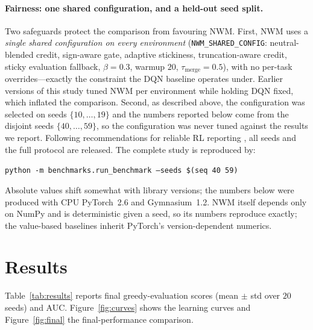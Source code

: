 \documentclass[11pt]{article}
\newcommand{\NWM}{\textsc{NWM}}
\begin{document}
\paragraph{Fairness: one shared configuration, and a held-out seed split.}
Two safeguards protect the comparison from favouring \NWM{}. First,
\NWM{} uses a \emph{single shared configuration on every environment}
(\texttt{NWM\_SHARED\_CONFIG}: neutral-blended credit, sign-aware gate,
adaptive stickiness, truncation-aware credit, sticky evaluation fallback,
$\beta{=}0.3$, warmup $20$, $\tau_{\mathrm{merge}}{=}0.5$), with no
per-task overrides---exactly the constraint the DQN baseline operates under.
Earlier versions of this study tuned \NWM{} per environment while holding DQN
fixed, which inflated the comparison. Second, as described above, the
configuration was selected on seeds $\{10,\dots,19\}$ and the numbers reported
below come from the disjoint seeds $\{40,\dots,59\}$, so the configuration was
never tuned against the results we report. Following recommendations for
reliable RL reporting \citep{henderson2018deep,agarwal2021deep}, all seeds and
the full protocol are released. The complete study is reproduced by:
\begin{center}
\texttt{python -m benchmarks.run\_benchmark --seeds \$(seq 40 59)}
\end{center}
Absolute values shift somewhat with library versions; the numbers below were
produced with CPU PyTorch~2.6 and Gymnasium~1.2. \NWM{} itself depends only on
NumPy and is deterministic given a seed, so its numbers reproduce exactly; the
value-based baselines inherit PyTorch's version-dependent numerics.

\section{Results}
\label{sec:results}

Table~\ref{tab:results} reports final greedy-evaluation scores (mean $\pm$ std
over $20$ seeds) and AUC. Figure~\ref{fig:curves} shows the learning curves and
Figure~\ref{fig:final} the final-performance comparison.

\begin{table}[t]
\centering
\caption{Final greedy evaluation (mean $\pm$ std over $20$ seeds) and normalized
AUC. Best final-eval per environment in \textbf{bold}. Higher is better for all
environments (Acrobot and MountainCar returns are negative). Bold marks the best
\emph{mean} only; Table~\ref{tab:paired} shows which of these gaps are
statistically supported, and on CartPole and Acrobot they are not.}
\label{tab:results}
\small

\end{table}
\end{document}
